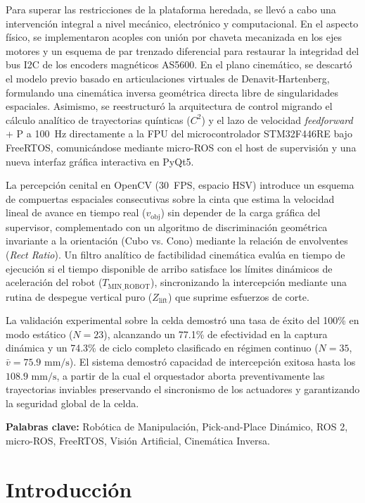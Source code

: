 \documentclass[12pt, a4paper]{report}
\begin{document}
Para superar las restricciones de la plataforma heredada, se llevó a cabo una intervención integral a nivel mecánico, electrónico y computacional. En el aspecto físico, se implementaron acoples con unión por chaveta mecanizada en los ejes motores y un esquema de par trenzado diferencial para restaurar la integridad del bus I2C de los encoders magnéticos AS5600. En el plano cinemático, se descartó el modelo previo basado en articulaciones virtuales de Denavit-Hartenberg, formulando una cinemática inversa geométrica directa libre de singularidades espaciales. Asimismo, se reestructuró la arquitectura de control migrando el cálculo analítico de trayectorias quínticas ($C^2$) y el lazo de velocidad \textit{feedforward} + P a 100~Hz directamente a la FPU del microcontrolador STM32F446RE bajo FreeRTOS, comunicándose mediante micro-ROS con el host de supervisión y una nueva interfaz gráfica interactiva en PyQt5.

La percepción cenital en OpenCV (30~FPS, espacio HSV) introduce un esquema de compuertas espaciales consecutivas sobre la cinta que estima la velocidad lineal de avance en tiempo real ($v_{\text{obj}}$) sin depender de la carga gráfica del supervisor, complementado con un algoritmo de discriminación geométrica invariante a la orientación (Cubo vs. Cono) mediante la relación de envolventes (\textit{Rect Ratio}). Un filtro analítico de factibilidad cinemática evalúa en tiempo de ejecución si el tiempo disponible de arribo satisface los límites dinámicos de aceleración del robot ($T_{\text{MIN\_ROBOT}}$), sincronizando la intercepción mediante una rutina de despegue vertical puro ($Z_{\text{lift}}$) que suprime esfuerzos de corte.

La validación experimental sobre la celda demostró una tasa de éxito del 100\% en modo estático ($N=23$), alcanzando un 77.1\% de efectividad en la captura dinámica y un 74.3\% de ciclo completo clasificado en régimen continuo ($N=35$, $\bar{v} = 75.9\text{ mm/s}$). El sistema demostró capacidad de intercepción exitosa hasta los $108.9\text{ mm/s}$, a partir de la cual el orquestador aborta preventivamente las trayectorias inviables preservando el sincronismo de los actuadores y garantizando la seguridad global de la celda.

\vfill
\noindent \textbf{Palabras clave:} Robótica de Manipulación, Pick-and-Place Dinámico, ROS 2, micro-ROS, FreeRTOS, Visión Artificial, Cinemática Inversa.

\newpage
\tableofcontents
\newpage

\chapter{Introducción}
\end{document}
